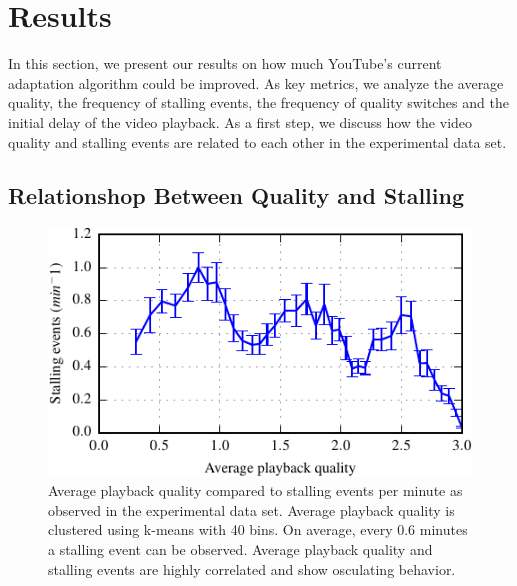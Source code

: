 
\section{Results}
\label{sec:results}

In this section, we present our results on how much YouTube's current adaptation algorithm could be improved. As key metrics, we analyze the average quality, the frequency of stalling events, the frequency of quality switches and the initial delay of the video playback. As a first step, we discuss how the video quality and stalling events are related to each other in the experimental data set.

\subsection{Relationshop Between Quality and Stalling}

\begin{figure}[t]
\centering
\includegraphics[width=\columnwidth]{figs/33qualityvstalling}%
\caption{Average playback quality compared to stalling events per minute as observed in the experimental data set. Average playback quality is clustered using k-means with 40 bins. On average, every 0.6 minutes a stalling event can be observed. Average playback quality and stalling events are highly correlated and show osculating behavior.}
\label{fig:qualityvsstalling}%
\end{figure}

